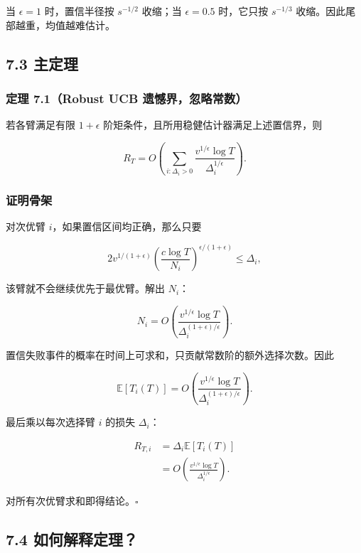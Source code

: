 \documentclass[
  11pt,
  a4paper,
]{ctexart}
\begin{document}
当 \(\epsilon=1\) 时，置信半径按 \(s^{-1/2}\) 收缩；当 \(\epsilon=0.5\)
时，它只按 \(s^{-1/3}\) 收缩。因此尾部越重，均值越难估计。

\subsection{7.3 主定理}\label{ux4e3bux5b9aux7406}

\subsubsection{定理 7.1（Robust UCB
遗憾界，忽略常数）}\label{ux5b9aux7406-7.1robust-ucb-ux9057ux61beux754cux5ffdux7565ux5e38ux6570}

若各臂满足有限 \(1+\epsilon\)
阶矩条件，且所用稳健估计器满足上述置信界，则

\[
R_T
=O\left(
\sum_{i:\Delta_i>0}
\frac{v^{1/\epsilon}\log T}{\Delta_i^{1/\epsilon}}
\right).
\]

\subsubsection{证明骨架}\label{ux8bc1ux660eux9aa8ux67b6}

对次优臂 \(i\)，如果置信区间均正确，那么只要

\[
2v^{1/(1+\epsilon)}
\left(\frac{c\log T}{N_i}\right)^{\epsilon/(1+\epsilon)}
\le\Delta_i,
\]

该臂就不会继续优先于最优臂。解出 \(N_i\)：

\[
N_i
=O\left(
\frac{v^{1/\epsilon}\log T}
{\Delta_i^{(1+\epsilon)/\epsilon}}
\right).
\]

置信失败事件的概率在时间上可求和，只贡献常数阶的额外选择次数。因此

\[
\mathbb E[T_i(T)]
=O\left(
\frac{v^{1/\epsilon}\log T}
{\Delta_i^{(1+\epsilon)/\epsilon}}
\right).
\]

最后乘以每次选择臂 \(i\) 的损失 \(\Delta_i\)：

\[
\begin{aligned}
R_{T,i}
&=\Delta_i\mathbb E[T_i(T)]\\
&=O\left(
\frac{v^{1/\epsilon}\log T}
{\Delta_i^{1/\epsilon}}
\right).
\end{aligned}
\]

对所有次优臂求和即得结论。\(\square\)

\subsection{7.4
如何解释定理？}\label{ux5982ux4f55ux89e3ux91caux5b9aux7406}
\end{document}
